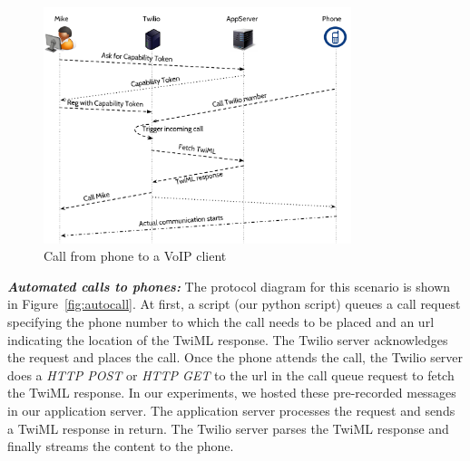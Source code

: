  
\begin{figure}[t!] 
\centering
  \includegraphics[width=0.8\textwidth]{figs/p2c.pdf}
\caption{Call from phone to a VoIP client}
\label{fig:callfromphone}
\end{figure}

\emph{\textbf{Automated calls to phones:} }
The protocol diagram for this scenario is shown in  Figure~\ref{fig:autocall}. At first, a script (our python script) queues a call request specifying the phone number to which the call needs to be placed and an url indicating the location of the TwiML response. The Twilio server acknowledges the request and places the call. Once the phone attends the call, the Twilio server does a \textit{HTTP POST} or \textit{HTTP GET} to the url in the call queue request to fetch the TwiML response. In our experiments, we hosted these pre-recorded messages in our application server. The application server processes the request and sends a TwiML response in return. The Twilio server parses the TwiML response and finally streams the content to the phone.  

